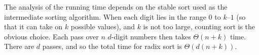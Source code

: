 The analysis of the running time depends on the stable sort used as the intermediate sorting algorithm. When each digit lies in the range $0$ to $k – 1$ (so that it can take on $k$ possible values), and $k$ is not too large, counting sort is the obvious choice. Each pass over $n$ $d$-digit numbers then takes $\Theta(n + k)$ time. There are $d$ passes, and so the total time for radix sort is $\Theta\left(d(n + k)\right)$.






